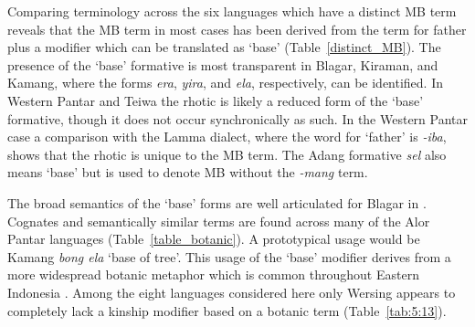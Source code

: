  
Comparing terminology across the six languages which have a distinct MB term reveals that the MB term in most cases has been derived from the term for father plus a modifier which can be translated as `base' (Table~\ref{distinct_MB}). The presence of the `base' formative is most transparent in Blagar, Kiraman, and Kamang, where the forms \textit{era}, \textit{yira}, and \textit{ela}, respectively, can be identified. In Western Pantar and Teiwa the rhotic is likely a reduced form of the `base' formative, though it does not occur synchronically as such. In the Western Pantar case a comparison with the Lamma dialect, where the word for `father' is \textit{-iba}, shows that the rhotic is unique to the MB term. The Adang formative \textit{sel} also means `base' but is used to denote MB without the \textit{-mang} term.




The broad semantics of the `base' forms are well articulated for Blagar in \citet[156]{Steinhauer1993}. Cognates and semantically similar terms are found across many of the Alor Pantar languages (Table~\ref{table_botanic}). A prototypical usage would be Kamang \textit{bong ela} `base of tree'. This usage of the `base' modifier derives from a more widespread botanic metaphor which is common throughout Eastern Indonesia \citep{Fox1995}. Among the eight languages considered here only Wersing appears to completely lack a kinship modifier based on a botanic term (Table~\ref{tab:5:13}).
  
